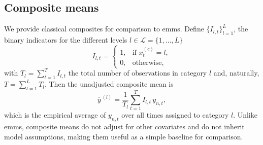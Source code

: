 \begin{subappendices}

    \section{Composite means}\label{sec:EDA_Perm}
    We provide classical composites for comparison to \glspl{emm}. Define $\{I_{l,t}\}_{l=1}^L$, the binary indicators for the different levels $l \in \mathcal{L} = \{1, \ldots, L\}$
    \begin{equation}
        I_{l,t} =
        \begin{cases}
            1, & \text{if }x^{(c)}_t = l, \\
            0, & \text{otherwise},
        \end{cases}
    \end{equation}
    with $T_l = \sum_{t = 1}^T I_{l,t}$ the total number of observations in category $l$ and, naturally, $T = \sum_{l=1}^L T_l$. Then the unadjusted composite mean is
    \begin{equation} \label{eq:comp}
        \overline{y}^{\,(l)} =  \frac{1}{T_l}\sum_{t=1}^T I_{l,t}\,y_{n,t},
    \end{equation}
    which is the empirical average of $y_{n,t}$ over all times assigned to category $l$. Unlike \glspl{emm}, composite means do not adjust for other covariates and do not inherit model assumptions, making them useful as a simple baseline for comparison.


\end{subappendices}
